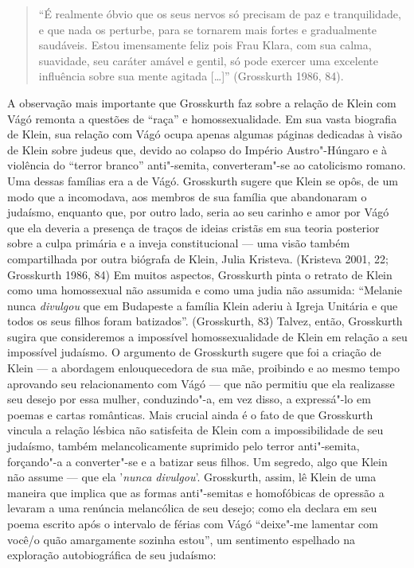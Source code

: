 \begin{quote}
``É realmente óbvio que os seus nervos só precisam de paz e
tranquilidade, e que nada os perturbe, para se tornarem mais fortes e
gradualmente saudáveis. Estou imensamente feliz pois Frau Klara, com sua
calma, suavidade, seu caráter amável e gentil, só pode exercer uma
excelente influência sobre sua mente agitada {[}\ldots{}{]}'' (Grosskurth
1986, 84).
\end{quote}

A observação mais importante que Grosskurth faz sobre a relação de Klein
com Vágó remonta a questões de ``raça'' e homossexualidade. Em sua vasta
biografia de Klein, sua relação com Vágó ocupa apenas algumas páginas
dedicadas à visão de Klein sobre judeus que, devido ao colapso do
Império Austro"-Húngaro e à violência do ``terror branco'' anti"-semita,
converteram"-se ao catolicismo romano. Uma dessas famílias era a de Vágó.
Grosskurth sugere que Klein se opôs, de um modo que a incomodava, aos
membros de sua família que abandonaram o judaísmo, enquanto que, por
outro lado, seria ao seu carinho e amor por Vágó que ela deveria a
presença de traços de ideias cristãs em sua teoria posterior sobre a
culpa primária e a inveja constitucional --- uma visão também
compartilhada por outra biógrafa de Klein, Julia Kristeva. (Kristeva
2001, 22; Grosskurth 1986, 84) Em muitos aspectos, Grosskurth pinta o
retrato de Klein como uma homossexual não assumida e como uma judia não
assumida: ``Melanie nunca \emph{divulgou} que em Budapeste a família
Klein aderiu à Igreja Unitária e que todos os seus filhos foram
batizados''. (Grosskurth, 83) Talvez, então, Grosskurth sugira que
consideremos a impossível homossexualidade de Klein em relação a seu
impossível judaísmo. O argumento de Grosskurth sugere que foi a criação
de Klein --- a abordagem enlouquecedora de sua mãe, proibindo e ao mesmo
tempo aprovando seu relacionamento com Vágó --- que não permitiu que ela
realizasse seu desejo por essa mulher, conduzindo"-a, em vez disso, a
expressá"-lo em poemas e cartas românticas. Mais crucial ainda é o fato
de que Grosskurth vincula a relação lésbica não satisfeita de Klein com
a impossibilidade de seu judaísmo, também melancolicamente suprimido
pelo terror anti"-semita, forçando"-a a converter"-se e a batizar seus
filhos. Um segredo, algo que Klein não assume --- que ela '\emph{nunca
divulgou}'. Grosskurth, assim, lê Klein de uma maneira que implica que
as formas anti"-semitas e homofóbicas de opressão a levaram a uma
renúncia melancólica de seu desejo; como ela declara em seu poema
escrito após o intervalo de férias com Vágó ``deixe"-me lamentar com
você/o quão amargamente sozinha estou'', um sentimento espelhado na
exploração autobiográfica de seu judaísmo:

